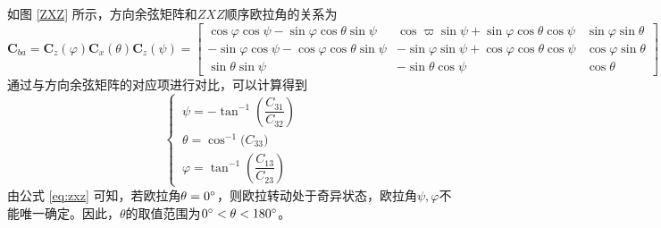 如图 \ref{ZXZ} 所示，方向余弦矩阵和$ZXZ$顺序欧拉角的关系为
\begin{equation}
	\bm{C}_{ba} = \bm{C}_z(\varphi) \bm{C}_x(\theta) \bm{C}_z(\psi) = 
	\begin{bmatrix}
		\cos \varphi \cos \psi - \sin \varphi \cos \theta \sin \psi & \cos \varpi \sin \psi + \sin \varphi \cos \theta \cos \psi & \sin \varphi \sin \theta \\
		- \sin \varphi \cos \psi - \cos \varphi \cos \theta \sin \psi & -\sin \varphi \sin \psi + \cos \varphi \cos \theta \cos \psi & \cos \varphi \sin \theta \\
		\sin \theta \sin \psi & -\sin \theta \cos \psi & \cos \theta 
	\end{bmatrix}
\end{equation}
通过与方向余弦矩阵的对应项进行对比，可以计算得到
\begin{equation}
	\begin{cases}
		\, \psi = -\tan^{-1}\left( \dfrac{C_{31}}{C_{32}} \right) \\
		\, \theta = \cos^{-1}\big( C_{33} \big) \\
		\, \varphi = \tan^{-1} \left( \dfrac{C_{13}}{C_{23}} \right)
	\end{cases}
	\label{eq:zxz}
\end{equation}
由公式 \eqref{eq:zxz} 可知，若欧拉角$\theta = 0{}^{\circ}$，则欧拉转动处于奇异状态，欧拉角$\psi, \varphi$不能唯一确定。因此，$\theta$的取值范围为$0{}^{\circ}<\theta<180{}^{\circ}$。
